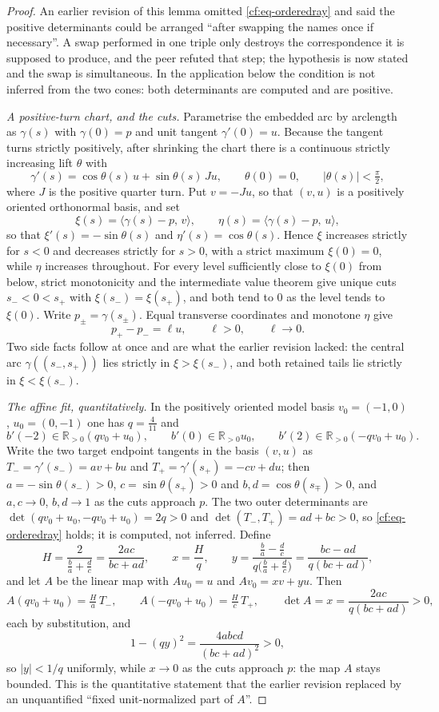 \begin{proof}
An earlier revision of this lemma omitted \eqref{cf:eq-orderedray} and said the
positive determinants could be arranged ``after swapping the names once if
necessary''. A swap performed in one triple only destroys the correspondence it
is supposed to produce, and the peer refuted that step; the hypothesis is now
stated and the swap is simultaneous. In the application below the condition is
not inferred from the two cones: both determinants are computed and are
positive.

\emph{A positive-turn chart, and the cuts.} Parametrise the embedded arc by
arclength as $\gamma(s)$ with $\gamma(0)=p$ and unit tangent $\gamma'(0)=u$.
Because the tangent turns strictly positively, after shrinking the chart there
is a continuous strictly increasing lift $\theta$ with
\[
   \gamma'(s)=\cos\theta(s)\,u+\sin\theta(s)\,Ju,\qquad
   \theta(0)=0,\qquad |\theta(s)|<\tfrac\pi2,
\]
where $J$ is the positive quarter turn. Put $v=-Ju$, so that $(v,u)$ is a
positively oriented orthonormal basis, and set
\[
   \xi(s)=\langle\gamma(s)-p,\,v\rangle,\qquad
   \eta(s)=\langle\gamma(s)-p,\,u\rangle,
\]
so that $\xi'(s)=-\sin\theta(s)$ and $\eta'(s)=\cos\theta(s)$. Hence $\xi$
increases strictly for $s<0$ and decreases strictly for $s>0$, with a strict
maximum $\xi(0)=0$, while $\eta$ increases throughout. For every level
sufficiently close to $\xi(0)$ from below, strict monotonicity and the
intermediate value theorem give unique cuts $s_-<0<s_+$ with
$\xi(s_-)=\xi(s_+)$, and both tend to $0$ as the level tends to $\xi(0)$. Write
$p_\pm=\gamma(s_\pm)$. Equal transverse coordinates and monotone $\eta$ give
\[
   p_+-p_-=\ell u,\qquad \ell>0,\qquad \ell\to0 .
\]
Two side facts follow at once and are what the earlier revision lacked: the
central arc $\gamma((s_-,s_+))$ lies strictly in $\xi>\xi(s_-)$, and both
retained tails lie strictly in $\xi<\xi(s_-)$.

\emph{The affine fit, quantitatively.} In the positively oriented model basis
$v_0=(-1,0)$, $u_0=(0,-1)$ one has $q=\tfrac4{11}$ and
\[
   b'(-2)\in\mathbb R_{>0}(qv_0+u_0),\qquad
   b'(0)\in\mathbb R_{>0}u_0,\qquad
   b'(2)\in\mathbb R_{>0}(-qv_0+u_0).
\]
Write the two target endpoint tangents in the basis $(v,u)$ as
$T_-=\gamma'(s_-)=av+bu$ and $T_+=\gamma'(s_+)=-cv+du$; then
$a=-\sin\theta(s_-)>0$, $c=\sin\theta(s_+)>0$ and $b,d=\cos\theta(s_\mp)>0$,
and $a,c\to0$, $b,d\to1$ as the cuts approach $p$. The two outer determinants
are $\det(qv_0+u_0,-qv_0+u_0)=2q>0$ and $\det(T_-,T_+)=ad+bc>0$, so
\eqref{cf:eq-orderedray} holds; it is computed, not inferred. Define
\[
   H=\frac{2}{\tfrac ba+\tfrac dc}=\frac{2ac}{bc+ad},\qquad
   x=\frac Hq,\qquad
   y=\frac{\tfrac ba-\tfrac dc}{q\bigl(\tfrac ba+\tfrac dc\bigr)}
    =\frac{bc-ad}{q(bc+ad)},
\]
and let $A$ be the linear map with $A u_0=u$ and $Av_0=xv+yu$. Then
\[
   A(qv_0+u_0)=\tfrac Ha\,T_-,\qquad
   A(-qv_0+u_0)=\tfrac Hc\,T_+,\qquad
   \det A=x=\frac{2ac}{q(bc+ad)}>0,
\]
each by substitution, and
\[
   1-(qy)^2=\frac{4abcd}{(bc+ad)^2}>0,
\]
so $|y|<1/q$ uniformly, while $x\to0$ as the cuts approach $p$: the map $A$
stays bounded. This is the quantitative statement that the earlier revision
replaced by an unquantified ``fixed unit-normalized part of $A$''.


\end{proof}
